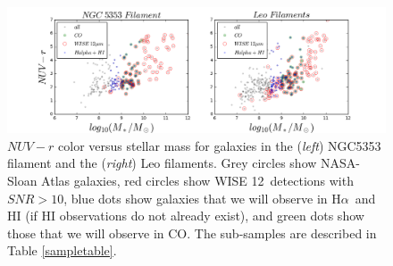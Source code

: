 \documentclass[11pt, preprint]{aastex}
\newcommand{\ha}{H$\alpha$}
\newcommand{\sers}{{\it S\'{e}rsic}}
\begin{document}



\begin{figure}[h]
\includegraphics[width=\textwidth]{sample.png}
\vspace{-0.8cm}
\caption{\small $NUV-r$ color versus stellar mass for galaxies 
  in the ({\it left}) NGC5353 filament and the ({\it right}) Leo filaments.
Grey circles show NASA-Sloan Atlas galaxies, red circles show WISE 12\micron\ detections with $SNR > 10$,  
blue dots show galaxies that we will observe in \ha \ and HI (if
HI observations do not already exist), and green
dots show those that we will observe in CO.  The sub-samples are described in Table \ref{sampletable}.}
\label{sample}
\end{figure}
\end{document}
